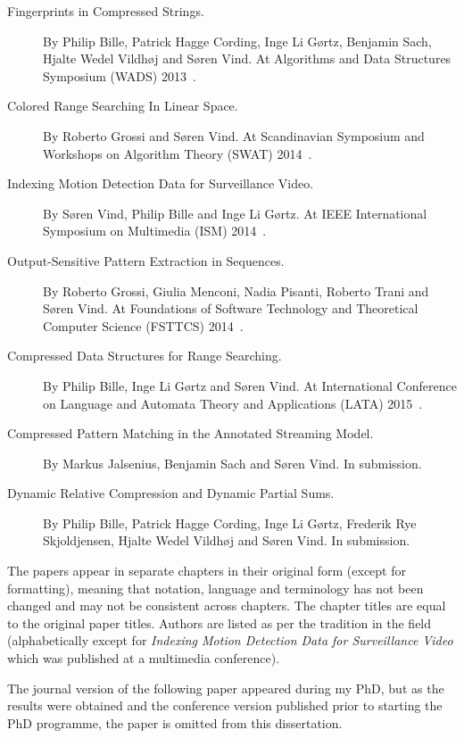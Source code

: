\begin{description}
    \item[Fingerprints in Compressed Strings.] By Philip Bille, Patrick Hagge Cording, Inge Li Gørtz, Benjamin Sach, Hjalte Wedel Vildhøj and Søren Vind. At Algorithms and Data Structures Symposium (WADS) 2013~\cite{bille2013fingerprints}.
    \item[Colored Range Searching In Linear Space.] By Roberto Grossi and Søren Vind. At Scandinavian Symposium and Workshops on Algorithm Theory (SWAT) 2014~\cite{grossi2014colored}.
    \item[Indexing Motion Detection Data for Surveillance Video.] By Søren Vind, Philip Bille and Inge Li Gørtz. At IEEE International Symposium on Multimedia (ISM) 2014~\cite{vind2014indexing}.
    \item[Output-Sensitive Pattern Extraction in Sequences.] By Roberto Grossi, Giulia Menconi, Nadia Pisanti, Roberto Trani and Søren Vind. At Foundations of Software Technology and Theoretical Computer Science (FSTTCS) 2014~\cite{grossi2014output}.
    \item[Compressed Data Structures for Range Searching.] By Philip Bille, Inge Li Gørtz and Søren Vind. At International Conference on Language and Automata Theory and Applications (LATA) 2015~\cite{bille2015compressedrs}.
    \item[Compressed Pattern Matching in the Annotated Streaming Model.] By Markus Jalsenius, Benjamin Sach and Søren Vind. In submission.
    \item[Dynamic Relative Compression and Dynamic Partial Sums.] By Philip Bille, Patrick Hagge Cording, Inge Li Gørtz, Frederik Rye Skjoldjensen, Hjalte Wedel Vildhøj and Søren Vind. In submission.
\end{description}

The papers appear in separate chapters in their original form (except for formatting), meaning that notation, language and terminology has not been changed and may not be consistent across chapters. The chapter titles are equal to the original paper titles. Authors are listed as per the tradition in the field (alphabetically except for \emph{Indexing Motion Detection Data for Surveillance Video} which was published at a multimedia conference). 

The journal version of the following paper appeared during my PhD, but as the results were obtained and the conference version published prior to starting the PhD programme, the paper is omitted from this dissertation.

